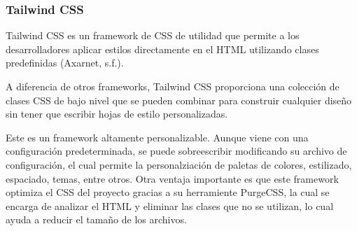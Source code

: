 \subsubsection{Tailwind CSS}
Tailwind CSS es un framework de CSS de utilidad que permite a los desarrolladores aplicar estilos directamente en el HTML utilizando clases predefinidas (Axarnet, s.f.).

A diferencia de otros frameworks, Tailwind CSS proporciona una colección de clases CSS de bajo nivel que se pueden combinar para construir cualquier diseño sin tener que escribir hojas de estilo personalizadas.

Este es un framework altamente personalizable. Aunque viene con una configuración predeterminada, se puede sobreescribir modificando su archivo de configuración, el cual permite la personalziación de paletas de colores, estilizado, espaciado, temas, entre otros. Otra ventaja importante es que este framework optimiza el CSS del proyecto gracias a su herramiente PurgeCSS, la cual se encarga de analizar el HTML y eliminar las clases que no se utilizan, lo cual ayuda a reducir el tamaño de los archivos.